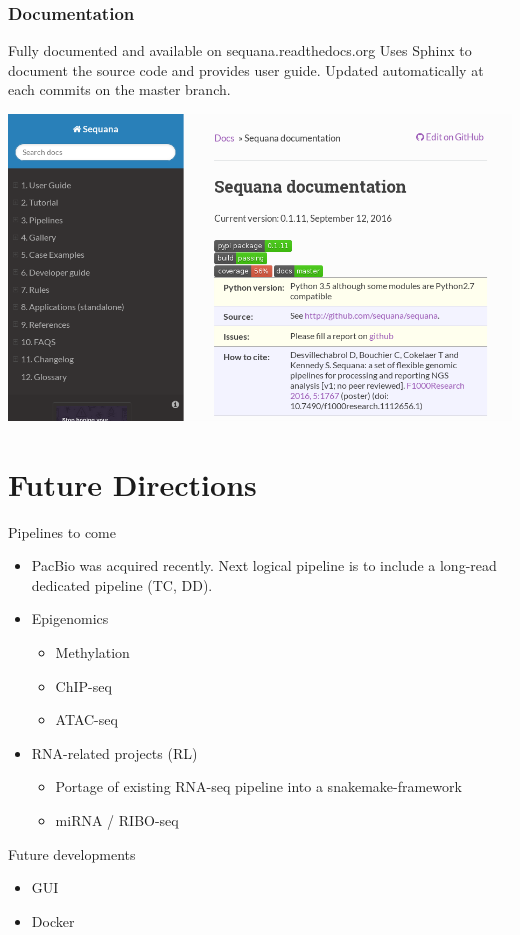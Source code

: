 \documentclass{beamer}
\begin{document}
\begin{frame}[fragile]
    \frametitle{Documentation}
    Fully documented and available on sequana.readthedocs.org
    Uses Sphinx to document the source code and provides user guide.
    Updated automatically at each commits on the master branch.
\begin{center}
\includegraphics[scale=0.3]{images/rtd}
\end{center}
    
\end{frame}


\section{Future Directions}

\begin{frame}
\begin{block}{Pipelines to come}
\begin{itemize}
 \item PacBio was acquired recently. Next logical pipeline is to include
 a long-read dedicated pipeline (TC, DD). 
 \item Epigenomics
     \begin{itemize}
     \item Methylation
      \item ChIP-seq
      \item ATAC-seq
     \end{itemize}
 \item RNA-related projects (RL)
     \begin{itemize}
     \item Portage of existing RNA-seq pipeline into a snakemake-framework
     \item miRNA / RIBO-seq   
     \end{itemize}
\end{itemize}
\end{block}

\begin{block}{Future developments}
 \begin{itemize}
  \item GUI 
  \item Docker
 \end{itemize}
\end{block}
 \end{frame}
\end{document}
